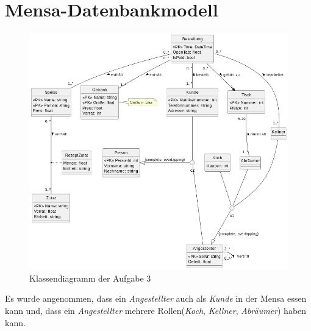 \documentclass[12pt]{scrartcl}
\begin{document}
\section{Mensa-Datenbankmodell}
\begin{figure}[h]
    \centering
    \includegraphics[width=0.9\linewidth]{../UE1_3.png}
    \caption{Klassendiagramm der Aufgabe 3}
\end{figure}

Es wurde angenommen, dass ein \emph{Angestellter} auch als \emph{Kunde} in der Mensa essen kann und,
dass ein \emph{Angestellter} mehrere Rollen(\emph{Koch}, \emph{Kellner}, \emph{Abräumer}) haben kann.
\end{document}
